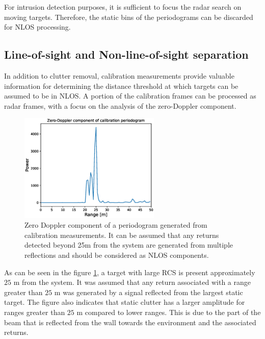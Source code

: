 	For intrusion detection purposes, it is sufficient to focus the radar search on moving targets. 
	Therefore, the static bins of the periodograms can be discarded for NLOS processing.
	
	\subsection{Line-of-sight and Non-line-of-sight separation}
	\label{sec:los_nlos_separation}
	
	
	
	In addition to clutter removal, calibration measurements provide valuable information for determining the distance threshold at which targets can be assumed to be in NLOS. 
	A portion of the calibration frames can be processed as radar frames, with a focus on the analysis of the zero-Doppler component.
	
	
	\begin{figure}[H]
		\centering
		\includegraphics[width=0.6\textwidth]{Images/Test1/cali_static_per_t1.eps}
		\caption{Zero Doppler component of a periodogram generated from calibration measurements. It can be assumed that any returns detected beyond 25m from the system are generated from multiple reflections and should be considered as NLOS components. }
		\label{fig:Test1_cali_static_per}
	\end{figure}
	
	As can be seen in the figure \ref{fig:Test1_cali_static_per}, a target with large RCS is present approximately $25$ m from the system. It was assumed that any return associated with a range greater than $25$ m was generated by a signal reflected from the largest static target. The figure also indicates that static clutter has a larger amplitude for ranges greater than $25$ m compared to lower ranges. This is due to the part of the beam that is reflected from the wall towards the environment and the associated returns.
	

